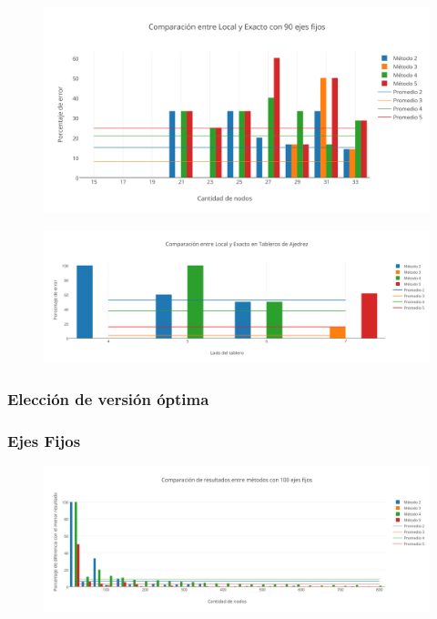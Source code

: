   \begin{figure}[h!]
   \begin{center}
 	\includegraphics[scale=0.7]{imagenes/local/exacto/90ejes.png}
   \end{center}
 \end{figure} 
 
 \newpage
  \begin{figure}[h!]
   \begin{center}
 	\includegraphics[scale=0.55]{imagenes/local/exacto/tableros.png}
   \end{center}
 \end{figure} 
 
\newpage 
 
\subsubsection{Elecci\'on de versi\'on \'optima}

\subsubsection*{Ejes Fijos}


  \begin{figure}[h!]
   \begin{center}
 	\includegraphics[scale=0.55]{imagenes/local/resultados/100ejes.png}
   \end{center}
 \end{figure}
 

